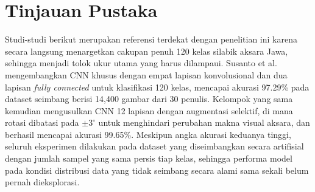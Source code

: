 \documentclass[conference]{IEEEtran}
\begin{document}
\section{Tinjauan Pustaka}
\label{sec:related}

Studi-studi berikut merupakan referensi terdekat dengan penelitian
ini karena secara langsung menargetkan cakupan penuh 120 kelas
silabik aksara Jawa, sehingga menjadi tolok ukur utama yang harus
dilampaui.
Susanto et al.~\cite{susantoIJECE2023} mengembangkan CNN khusus
dengan empat lapisan konvolusional dan dua lapisan \textit{fully
connected} untuk klasifikasi 120 kelas, mencapai akurasi 97.29\%
pada dataset seimbang berisi 14,400 gambar dari 30 penulis.
Kelompok yang sama~\cite{susantoIJAI2023} kemudian mengusulkan
CNN 12 lapisan dengan augmentasi selektif, di mana rotasi dibatasi
pada $\pm3^{\circ}$ untuk menghindari perubahan makna visual aksara,
dan berhasil mencapai akurasi 99.65\%.
Meskipun angka akurasi keduanya tinggi, seluruh eksperimen dilakukan
pada dataset yang diseimbangkan secara artifisial dengan jumlah
sampel yang sama persis tiap kelas, sehingga performa model pada
kondisi distribusi data yang tidak seimbang secara alami sama sekali
belum pernah dieksplorasi.
\end{document}
